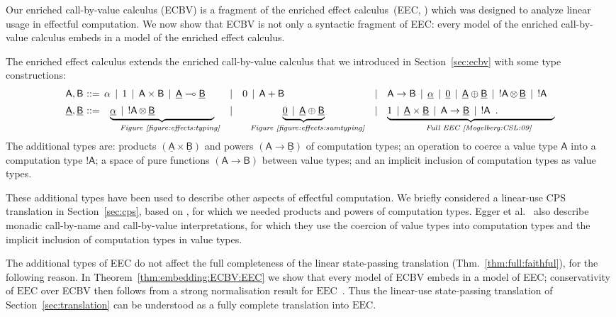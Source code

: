 \documentclass{LMCS}
\newcommand{\comptype}[1]{\underline{#1}}
\newcommand{\CconstA}{\comptype{\alpha}}
\newcommand{\VA}{\mathsf{A}}
\newcommand{\VB}{\mathsf{B}}
\newcommand{\CA}{\comptype{\mathsf{A}}}
\newcommand{\CB}{\comptype{\mathsf{B}}}
\newcommand{\tensor}{\otimes}
\newcommand{\ltensortype}[2]{{!} #1 \, {\tensor} \, #2}
\newcommand{\algplus}{\oplus}
\newcommand{\EEC}{\mathrm{EEC}}
\newcommand{\ECBV}{ECBV}
\begin{document}
Our enriched call-by-value calculus (ECBV) is a fragment of the enriched
effect calculus~(EEC, \cite{Mogelberg:CSL:09,EEC:journal}) which was
designed to analyze linear usage in effectful computation.  
We now show that ECBV is not only a syntactic fragment of EEC: every model of
the enriched call-by-value calculus embeds in a model of the enriched
effect calculus.

The enriched effect calculus extends the enriched
call-by-value calculus that we introduced in Section~\ref{sec:ecbv}
with some type constructions:
\[\begin{array}{r@{}lclcl}
\VA,\VB~ & ::=\, \alpha \,\mid\,1\,\mid\,\VA\times \VB\,\mid\,\CA\lpop\CB\,
&\mid&
0\,\mid\,\VA+\VB
&\mid&\VA\to\VB \,\mid\, \CconstA \,\mid  \,   \algzero\,\mid\,\CA \algplus \CB \,\mid\,\ltensortype{\VA}{\CB}\,\mid\,{!}\VA \\[5pt]
\CA,\CB~  & ::=\,
\underbrace{\CconstA \,\mid\,\ltensortype \VA\CB\hspace{2.1cm}}_{\text{\qquad \emph{Figure~\ref{figure:effects:typing}}}}
&
\mid&\underbrace{\algzero\,\mid\,\CA\oplus\CB}_{\text{\quad\emph{Figure~\ref{figure:effects:sumtyping}}}}
&\mid&
\underbrace{1 \,\mid\,\CA \times \CB \,\mid\,\VA\to\CB\,\mid\,{!}\VA
\enspace .\hspace{2cm}}_{\text{\qquad \emph{Full EEC~\cite{Mogelberg:CSL:09}}}} 
\end{array}\]
The additional types are: products $(\CA\times \CB)$ 
and powers $(\VA\to\CB)$ of computation types;
an operation to coerce a value type $\VA$ into a computation type ${!}\VA$;
a space of pure functions $(\VA\to\VB)$ between value types;
and an implicit inclusion of computation types as value types.

These additional types have been used to
describe other aspects of effectful computation.
We briefly considered a linear-use CPS translation
in Section~\ref{sec:cps}, based on \cite{Mogelberg:fossacs:10,EEC:LCPS:journal},
for which we needed products and powers of computation types.
Egger et al.~\cite{Mogelberg:CSL:09} also describe
monadic call-by-name and call-by-value 
interpretations, for which they use the coercion of 
value types into computation types and the implicit
inclusion of computation types in value types.

The additional types of EEC do not affect the full completeness
of the linear state-passing translation 
(Thm.~\ref{thm:full:faithful}), for the following reason.
In Theorem~\ref{thm:embedding:ECBV:EEC}
we show that every model of ECBV embeds in a model of EEC;
conservativity of $\EEC$ over {\ECBV} 
then 
follows from
a strong normalisation result for $\EEC$~\cite{EEC:journal}.
Thus the linear-use state-passing translation
of Section~\ref{sec:translation}
can be understood as a fully complete translation into $\EEC$.
\end{document}
